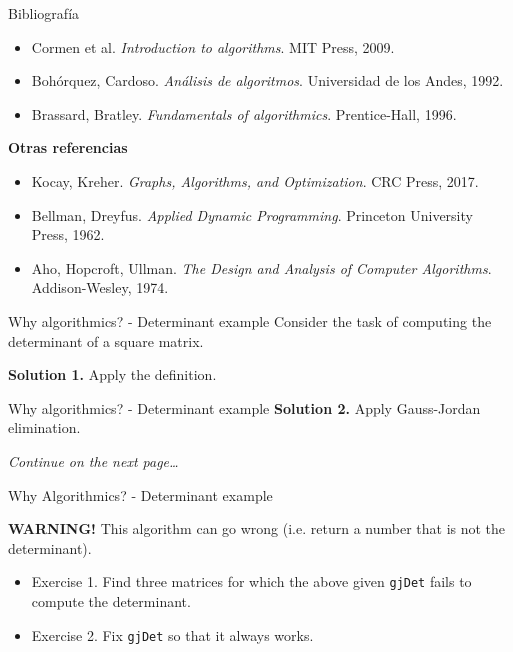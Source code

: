 \documentclass{beamer}
\begin{document}
%

\begin{frame}{Bibliografía}
\begin{itemize}
    \item Cormen et al. \textit{Introduction to algorithms}. MIT Press, 2009.
    \item Bohórquez, Cardoso. \textit{Análisis de algoritmos}. Universidad de los Andes, 1992. \pause
    \item Brassard, Bratley. \textit{Fundamentals of algorithmics}. Prentice-Hall, 1996. \smiley\smiley
\end{itemize}\pause

\bigskip

\textbf{Otras referencias}

\begin{itemize}
    \item Kocay, Kreher. \textit{Graphs, Algorithms, and Optimization}. CRC Press, 2017.
    \item Bellman, Dreyfus. \textit{Applied Dynamic Programming}. Princeton University Press, 1962.
    \item Aho, Hopcroft, Ullman. \textit{The Design and Analysis of Computer Algorithms}. Addison-Wesley, 1974.
\end{itemize}
\end{frame}

%

\begin{frame}{Why algorithmics? - Determinant example}
	Consider the task of computing the determinant of a square matrix.

	\textbf{Solution 1.} Apply the definition.

	
\end{frame}

%

\begin{frame}{Why algorithmics? - Determinant example}
	\textbf{Solution 2.} Apply Gauss-Jordan elimination.

	

	\textit{Continue on the next page\ldots}
\end{frame}

%

\begin{frame}{Why Algorithmics? - Determinant example}
	

	\textbf{WARNING!} This algorithm can go wrong (i.e. return a number that is
	not the determinant).
	\begin{itemize}
		\item Exercise 1. Find three matrices for which the above given \texttt{gjDet}
			fails to compute the determinant.
		\item Exercise 2. Fix \texttt{gjDet} so that it always works.
	\end{itemize}
\end{frame}
\end{document}
